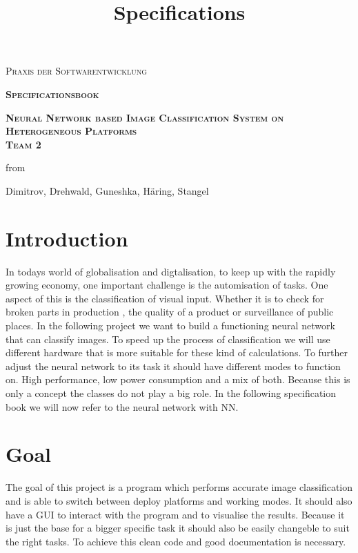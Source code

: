 \documentclass[parskip=full]{scrartcl}
\title{Specifications}
\author{}
\begin{document}
\renewcommand{\figurename}{Figure}
\begin{titlepage}
\centering
	\vspace{3cm}
	{\scshape\LARGE Praxis der Softwarentwicklung\par}
	\vspace{2cm}
	{\scshape\Huge\bfseries Specificationsbook \par}	
	\vspace{2cm}
	{\scshape\Huge\bfseries Neural Network based Image Classification System on Heterogeneous Platforms \\ Team 2 \par}
	\vspace{2cm}
	{\Large from \par}
	\vspace{0.25cm}
	{\Large Dimitrov, Drehwald, Guneshka, Häring, Stangel \par}
	\vfill
\end{titlepage}
\newpage
\tableofcontents
\newpage
\section{Introduction}
In todays world of globalisation and digtalisation, to keep up with the rapidly growing economy, one important challenge is the automisation of tasks. One aspect of this is the classification of visual input. Whether it is to check for broken parts in production , the quality of a product or surveillance of public places. In the following project we want to build a functioning neural network that can classify images. To speed up the process of classification we will use different hardware that is more suitable for these kind of calculations. To further adjust the neural network to its task it should have different modes to function on. High performance, low power consumption and a mix of both. Because this is only a concept the classes do not play a big role. In the following specification book we will now refer to the neural network with NN.

\section{Goal}
The goal of this project is a program which performs accurate image classification and is able to switch between deploy platforms and working modes.
It should also have a GUI to interact with the program and to visualise the results.
Because it is just the base for a bigger specific task it should also be easily changeble to suit the right tasks. To achieve this clean code and good documentation is necessary.
\end{document}
